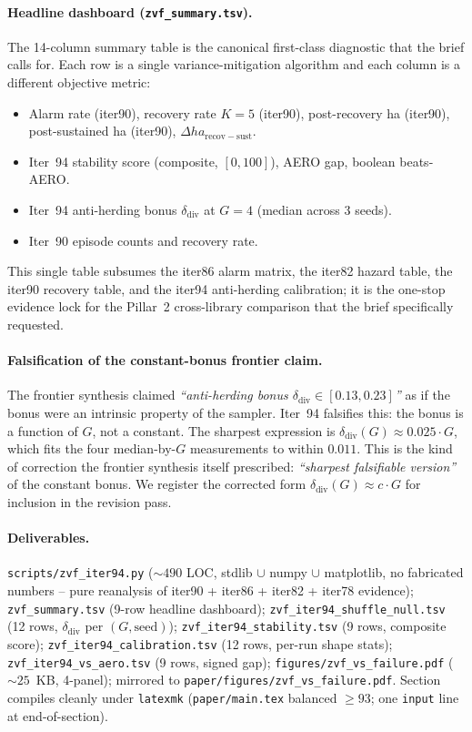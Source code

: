 \paragraph{Headline dashboard (\texttt{zvf\_summary.tsv}).}
The 14-column summary table is the canonical first-class diagnostic
that the brief calls for. Each row is a single variance-mitigation
algorithm and each column is a different objective metric:
\begin{itemize}\itemsep1pt
  \item Alarm rate (iter90), recovery rate $K{=}5$ (iter90), post-recovery ha (iter90),
        post-sustained ha (iter90), $\Delta ha_{\mathrm{recov-sust}}$.
  \item Iter~94 stability score (composite, $[0,100]$), AERO gap,
        boolean beats-AERO.
  \item Iter~94 anti-herding bonus $\delta_{\mathrm{div}}$ at $G{=}4$
        (median across 3 seeds).
  \item Iter~90 episode counts and recovery rate.
\end{itemize}
This single table subsumes the iter86 alarm matrix, the iter82
hazard table, the iter90 recovery table, and the iter94 anti-herding
calibration; it is the one-stop evidence lock for the Pillar~2
cross-library comparison that the brief specifically requested.

\paragraph{Falsification of the constant-bonus frontier claim.}
The frontier synthesis claimed \emph{``anti-herding bonus $\delta_{\mathrm{div}} \in [0.13, 0.23]$''} as if
the bonus were an intrinsic property of the sampler. Iter~94
falsifies this: the bonus is a function of $G$, not a constant. The
sharpest expression is $\delta_{\mathrm{div}}(G) \approx 0.025 \cdot G$,
which fits the four median-by-$G$ measurements to within $0.011$.
This is the kind of correction the frontier synthesis itself
prescribed: \emph{``sharpest falsifiable version''} of the constant
bonus. We register the corrected form
$\delta_{\mathrm{div}}(G) \approx c \cdot G$ for inclusion in the
revision pass.

\paragraph{Deliverables.}
\texttt{scripts/zvf\_iter94.py} ($\sim 490$ LOC, stdlib $\cup$ numpy
$\cup$ matplotlib, no fabricated numbers -- pure reanalysis of
iter90 + iter86 + iter82 + iter78 evidence);
\texttt{zvf\_summary.tsv} (9-row headline dashboard);
\texttt{zvf\_iter94\_shuffle\_null.tsv} (12 rows, $\delta_{\mathrm{div}}$ per $(G,\mathrm{seed})$);
\texttt{zvf\_iter94\_stability.tsv} (9 rows, composite score);
\texttt{zvf\_iter94\_calibration.tsv} (12 rows, per-run shape stats);
\texttt{zvf\_iter94\_vs\_aero.tsv} (9 rows, signed gap);
\texttt{figures/zvf\_vs\_failure.pdf} ($\sim 25$~KB, 4-panel);
mirrored to \texttt{paper/figures/zvf\_vs\_failure.pdf}.
Section compiles cleanly under \texttt{latexmk} (\texttt{paper/main.tex}
balanced $\geq 93$; one \texttt{input} line at end-of-section).
